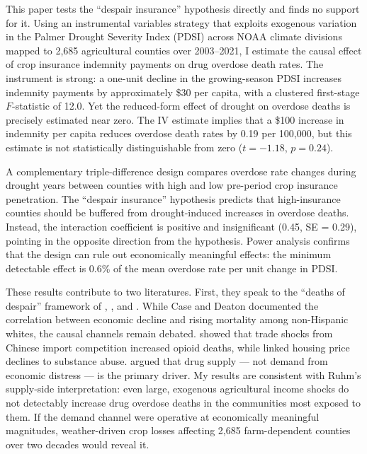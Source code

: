 \documentclass[12pt]{article}
\begin{document}
This paper tests the ``despair insurance'' hypothesis directly and finds no support for it. Using an instrumental variables strategy that exploits exogenous variation in the Palmer Drought Severity Index (PDSI) across NOAA climate divisions mapped to 2,685 agricultural counties over 2003--2021, I estimate the causal effect of crop insurance indemnity payments on drug overdose death rates. The instrument is strong: a one-unit decline in the growing-season PDSI increases indemnity payments by approximately \$30 per capita, with a clustered first-stage $F$-statistic of 12.0. Yet the reduced-form effect of drought on overdose deaths is precisely estimated near zero. The IV estimate implies that a \$100 increase in indemnity per capita reduces overdose death rates by 0.19 per 100,000, but this estimate is not statistically distinguishable from zero ($t = -1.18$, $p = 0.24$).

A complementary triple-difference design compares overdose rate changes during drought years between counties with high and low pre-period crop insurance penetration. The ``despair insurance'' hypothesis predicts that high-insurance counties should be buffered from drought-induced increases in overdose deaths. Instead, the interaction coefficient is positive and insignificant (0.45, SE = 0.29), pointing in the opposite direction from the hypothesis. Power analysis confirms that the design can rule out economically meaningful effects: the minimum detectable effect is 0.6\% of the mean overdose rate per unit change in PDSI.

These results contribute to two literatures. First, they speak to the ``deaths of despair'' framework of \citet{case2015rising}, \citet{case2017mortality}, and \citet{case2020deaths}. While Case and Deaton documented the correlation between economic decline and rising mortality among non-Hispanic whites, the causal channels remain debated. \citet{pierce2020trade} showed that trade shocks from Chinese import competition increased opioid deaths, while \citet{charles2019housing} linked housing price declines to substance abuse. \citet{ruhm2019drivers} argued that drug supply --- not demand from economic distress --- is the primary driver. My results are consistent with Ruhm's supply-side interpretation: even large, exogenous agricultural income shocks do not detectably increase drug overdose deaths in the communities most exposed to them. If the demand channel were operative at economically meaningful magnitudes, weather-driven crop losses affecting 2,685 farm-dependent counties over two decades would reveal it.
\end{document}

